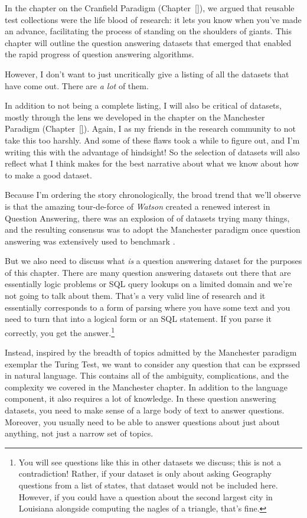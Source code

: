 \label{chapter:nq}

In the chapter on the Cranfield Paradigm (Chapter~\ref{}), we argued
that reusable test collections were the life blood of research: it
lets you know when you've made an advance, facilitating the process of
standing on the shoulders of giants.
%
This chapter will outline the question answering datasets that emerged
that enabled the rapid progress of question answering algorithms.

However, I don't want to just uncritically give a listing of all the
datasets that have come out.
%
There are \emph{a lot} of them.

In addition to not being a complete listing, I will also be critical
of datasets, mostly through the lens we developed in the chapter on
the Manchester Paradigm (Chapter~\ref{}).
%
Again, I as my friends in the research community to not take this too
harshly.
%
And some of these flaws took a while to figure out, and I'm writing
this with the advantage of hindsight!
%
So the selection of datasets will also reflect what I think makes for
the best narrative about what we know about how to make a good
dataset.

Because I'm ordering the story chronologically, the broad trend that
we'll observe is that the amazing tour-de-force of \textit{Watson}
created a renewed interest in Question Answering, there was an
explosion of of datasets trying many things, and the resulting
consensus was to adopt the Manchester paradigm once question answering
was extensively used to benchmark .

But we also need to discuss what \emph{is} a question answering dataset for the purposes of this chapter.
%
There are many question answering datasets out there that are
essentially logic problems or SQL query lookups on a limited domain
and we're not going to talk about them.
%
That's a very valid line of research and it essentially
corresponds to a form of parsing where you have some text and you need
to turn that into a logical form or an SQL statement.  If you parse it
correctly, you get the answer.\footnote{You will see questions like this in other datasets we discuss; this is not a contradiction!  Rather, if your dataset is only about asking Geography questions from a list of  states, that dataset would not be included here.  However, if you could have a question about the second largest city in Louisiana alongside computing the nagles of a triangle, that's fine.}

Instead, inspired by the breadth of topics admitted by the Manchester paradigm exemplar the Turing Test, we want to consider any question that can be exprssed in natural language.
%
This contains all of the ambiguity, complications, and the complexity we covered in the Manchester chapter.
%
In addition to the language component, it also requires a lot of knowledge.
%
In these question answering datasets, you need to make sense of a
large body of text to answer questions.  Moreover, you usually need to
be able to answer questions about just about anything, not just a
narrow set of topics.

